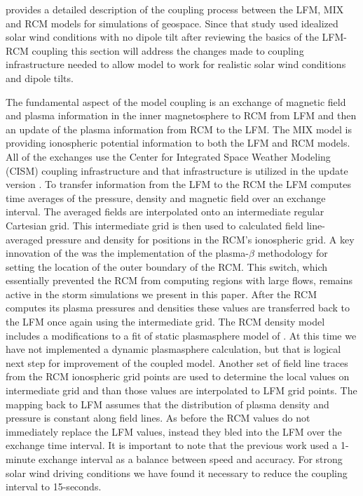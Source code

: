\documentclass[draft,jgrga]{agutex}
\begin{document}
\begin{article}
\cite{Pembroke:2012gc} provides a detailed description of the coupling process between the LFM, MIX and RCM models for simulations of geospace.  Since that study used idealized solar wind conditions with no dipole tilt after reviewing the basics of the LFM-RCM coupling this section will address the changes made to coupling infrastructure needed to allow model to work for realistic solar wind conditions and dipole tilts.  

The fundamental aspect of the model coupling is an exchange of magnetic field and plasma information in the inner magnetosphere to RCM from LFM and then an update of the plasma information from RCM to the LFM.  The MIX model is providing ionospheric potential information to both the LFM and RCM models.  All of the exchanges use the Center for Integrated Space Weather Modeling (CISM)  coupling infrastructure  and that infrastructure is utilized in the update version \citep{2004JASTP..66.1469G}.  To transfer information from the LFM to the RCM the LFM computes time averages of the pressure, density and magnetic field over an exchange interval. The averaged fields are interpolated onto an intermediate regular Cartesian grid.  This intermediate grid is then used to calculated field line-averaged pressure and density for positions in the RCM's ionospheric grid.  A key innovation of the \cite{Pembroke:2012gc} was the implementation of the plasma-$\beta$ methodology for setting the location of the outer boundary of the RCM.  This switch, which essentially prevented the RCM from computing regions with large flows, remains active in the storm simulations we present in this paper.   After the RCM computes its plasma pressures and densities these values are transferred back to the LFM once again using the intermediate grid.  The RCM density model includes a modifications to a fit of static plasmasphere model of \cite{Gallagher:2000p2797}.  At this time we have not implemented a dynamic plasmasphere calculation, but that is logical next step for improvement of the coupled model.  Another set of field line traces from the RCM ionospheric grid points are used to determine the local values on intermediate grid and than those values are interpolated to LFM grid points.  The mapping back to LFM assumes that the distribution of plasma density and pressure  is constant along field lines. As before the RCM values do not immediately replace the LFM values, instead they bled into the LFM over the exchange time interval.  It is important to note that the previous work used a 1-minute exchange interval as a  balance between speed and accuracy.  For strong solar wind driving conditions we have found it necessary to reduce the coupling interval to 15-seconds. 


\end{article}
\end{document}
